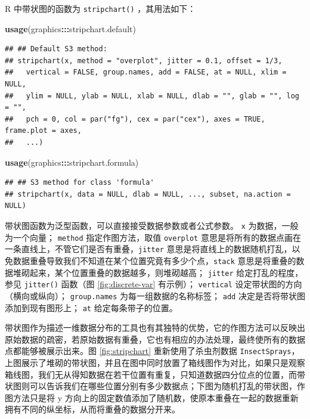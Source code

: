 \documentclass[
  b5paper,
  UTF8,twoside]{book}
\newenvironment{Shaded}{\begin{snugshade}}{\end{snugshade}}
\newcommand{\FunctionTok}[1]{\textcolor[rgb]{0.13,0.29,0.53}{\textbf{#1}}}
\newcommand{\NormalTok}[1]{#1}
\newcommand{\SpecialCharTok}[1]{\textcolor[rgb]{0.81,0.36,0.00}{\textbf{#1}}}
\begin{document}
R 中带状图的函数为 \texttt{stripchart()} ，其用法如下：

\begin{Shaded}
\begin{Highlighting}[]
\FunctionTok{usage}\NormalTok{(graphics}\SpecialCharTok{:::}\NormalTok{stripchart.default)}
\end{Highlighting}
\end{Shaded}

\begin{verbatim}
## ## Default S3 method:
## stripchart(x, method = "overplot", jitter = 0.1, offset = 1/3,
##   vertical = FALSE, group.names, add = FALSE, at = NULL, xlim = NULL,
##   ylim = NULL, ylab = NULL, xlab = NULL, dlab = "", glab = "", log = "",
##   pch = 0, col = par("fg"), cex = par("cex"), axes = TRUE, frame.plot = axes,
##   ...)
\end{verbatim}

\begin{Shaded}
\begin{Highlighting}[]
\FunctionTok{usage}\NormalTok{(graphics}\SpecialCharTok{:::}\NormalTok{stripchart.formula)}
\end{Highlighting}
\end{Shaded}

\begin{verbatim}
## ## S3 method for class 'formula'
## stripchart(x, data = NULL, dlab = NULL, ..., subset, na.action = NULL)
\end{verbatim}

带状图函数为泛型函数，可以直接接受数据参数或者公式参数。 \texttt{x} 为数据，一般为一个向量； \texttt{method} 指定作图方法，取值 \texttt{overplot} 意思是将所有的数据点画在一条直线上，不管它们是否有重叠，\texttt{jitter} 意思是将直线上的数据随机打乱，以免数据重叠导致我们不知道在某个位置究竟有多少个点，\texttt{stack} 意思是将重叠的数据堆砌起来，某个位置重叠的数据越多，则堆砌越高； \texttt{jitter} 给定打乱的程度，参见 \texttt{jitter()} 函数（图 \ref{fig:discrete-var} 有示例）； \texttt{vertical} 设定带状图的方向（横向或纵向）； \texttt{group.names} 为每一组数据的名称标签； \texttt{add} 决定是否将带状图添加到现有图形上； \texttt{at} 给定每条带子的位置。

带状图作为描述一维数据分布的工具也有其独特的优势，它的作图方法可以反映出原始数据的疏密，若原始数据有重叠，它也有相应的办法处理，最终使所有的数据点都能够被展示出来。图 \ref{fig:stripchart}
重新使用了杀虫剂数据 \texttt{InsectSprays}，上图展示了堆砌的带状图，并且在图中同时放置了箱线图作为对比，如果只是观察箱线图，我们无从得知数据在若干位置有重复，只知道数据四分位点的位置，而带状图则可以告诉我们在哪些位置分别有多少数据点；下图为随机打乱的带状图，作图方法只是将 y 方向上的固定数值添加了随机数，使原本重叠在一起的数据重新拥有不同的纵坐标，从而将重叠的数据分开来。
\end{document}
